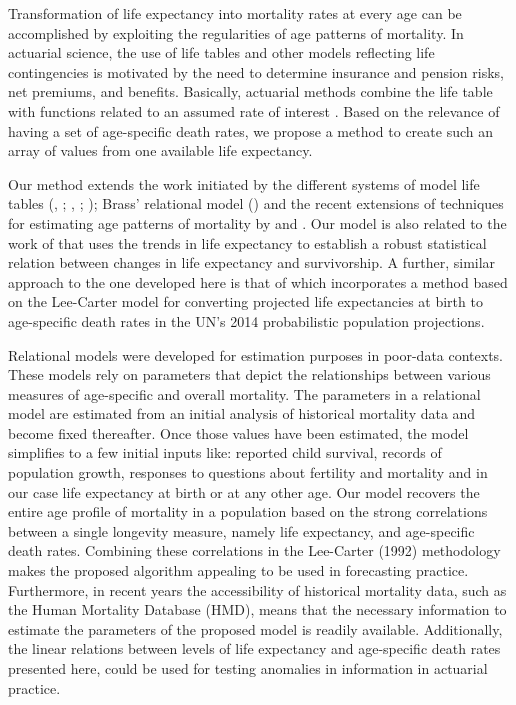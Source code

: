 \documentclass[risks,article,submit,moreauthors,pdftex]{Definitions/mdpi}
\begin{document}
Transformation of life expectancy into mortality rates at every age can be accomplished by exploiting the regularities of age patterns of mortality. In actuarial science, the use of life tables and other models reflecting life contingencies is motivated by the need to determine insurance and pension risks, net premiums, and benefits. Basically, actuarial methods combine the life table with functions related to an assumed rate of interest \citep{moller2007, dickson2013}. Based on the relevance of having a set of age-specific death rates, we propose a method to create such an array of values from one available life expectancy. 

Our method extends the work initiated by the different systems of model life tables  (\citealp{gabriel1958, UN1955}, \citeyear{UN1967}; \citealp{coale1966}, \citeyear{coale1983};  \citealp{ledermann1969, sullivan1972}); Brass' relational model (\citeyear{brass1968, brass1971}) and the recent extensions of techniques for estimating age patterns of mortality by \cite{murray2003} and \cite{wilmoth2012}. Our model is also related to the work of \cite{mayhew2013} that uses the trends in life expectancy to establish a robust statistical relation between changes in life expectancy and survivorship. A further, similar approach to the one developed here is that of \cite{sevcikova2016} which incorporates a method based on the Lee-Carter model for converting projected life expectancies at birth to age-specific death rates in the UN's 2014 probabilistic population projections.

Relational models were developed for estimation purposes in poor-data contexts. These models rely on parameters that depict the relationships between various measures of age-specific and overall mortality. The parameters in a relational model are estimated from an initial analysis of historical mortality data and become fixed thereafter. Once those values have been estimated, the model simplifies to a few initial inputs like: reported child survival, records of population growth, responses to questions about fertility and mortality and in our case life expectancy at birth or at any other age. Our model recovers the entire age profile of mortality in a population based on the strong correlations between a single longevity measure, namely life expectancy, and age-specific death rates. Combining these correlations in the Lee-Carter (1992) methodology makes the proposed algorithm appealing to be used in forecasting practice. Furthermore, in recent years the accessibility of historical mortality data, such as the Human Mortality Database (HMD), means that the necessary information to estimate the parameters of the proposed model is readily available. Additionally, the linear relations between levels of life expectancy and age-specific death rates presented here, could be used for testing anomalies in information in actuarial practice.
\end{document}

